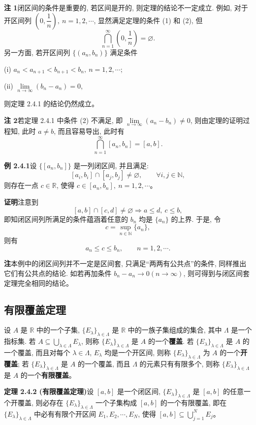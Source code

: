 \documentclass[UTF8, 12pt, fontset=fandol, oneside]{ctexart}
\begin{document}
\noindent\textbf{注 1}\quad 闭区间的条件是重要的, 若区间是开的, 则定理的结论不一定成立. 例如, 对于开区间列 $\left(0,\dfrac1n\right),\ n=1,2,\cdots$, 显然满足定理的条件 (1) 和 (2), 但
\[
  \bigcap_{n=1}^\infty\left(0,\frac1n\right)=\varnothing.
\]
另一方面, 若开区间列 $\{(a_n,b_n)\}$ 满足条件

(i) $a_n<a_{n+1}<b_{n+1}<b_n,\ n=1,2,\cdots$;

(ii) $\lim\limits_{n\to\infty}(b_n-a_n)=0$,

则定理 2.4.1 的结论仍然成立。

\noindent\textbf{注 2}\quad 若定理 2.4.1 中条件 (2) 不满足, 即 $\lim\limits_{n\to\infty}(a_n-b_n)\ne0$, 则由定理的证明过程知, 此时 $a\ne b$, 而且容易导出, 此时有
\[
  \bigcap_{n=1}^\infty [a_n,b_n]=[a,b].
\]

\noindent\textbf{例 2.4.1}\quad 设 $\{[a_n,b_n]\}$ 是一列闭区间, 并且满足:
\[
  [a_i,b_i]\cap[a_j,b_j]\ne\varnothing,\qquad \forall i,j\in\mathbb{N},
\]
则存在一点 $c\in\mathbb{R}$, 使得 $c\in[a_n,b_n],\ n=1,2,\cdots$。

\noindent\textbf{证明}\quad 注意到
\[
  [a,b]\cap[c,d]\ne\varnothing\Rightarrow a\leqslant d,\ c\leqslant b,
\]
即知闭区间列所满足的条件蕴涵着任意的 $b_n$ 均是 $\{a_n\}$ 的上界. 于是, 令
\[
  c=\sup_{n\in\mathbb{N}}\{a_n\},
\]
则有
\[
  a_n\leqslant c\leqslant b_n,\qquad n=1,2,\cdots .
\]

\noindent\textbf{注}\quad 本例中的闭区间列并不一定是区间套, 只满足``两两有公共点''的条件, 同样推出它们有公共点的结论. 如若再加条件 $b_n-a_n\to0(n\to\infty)$, 则可得到与闭区间套定理完全相同的结论。

\subsection{有限覆盖定理}

设 $A$ 是 $\mathbb{R}$ 中的一个子集, $\{E_\lambda\}_{\lambda\in\Lambda}$ 是 $\mathbb{R}$ 中的一族子集组成的集合, 其中 $\Lambda$ 是一个指标集. 若 $A\subseteq\bigcup_{\lambda\in\Lambda}E_\lambda$, 则称 $\{E_\lambda\}_{\lambda\in\Lambda}$ 是 $A$ 的一个\textbf{覆盖}. 若 $\{E_\lambda\}_{\lambda\in\Lambda}$ 是 $A$ 的一个覆盖, 而且对每个 $\lambda\in\Lambda$, $E_\lambda$ 均是一个开区间, 则称 $\{E_\lambda\}_{\lambda\in\Lambda}$ 为 $A$ 的一个\textbf{开覆盖}; 若 $\{E_\lambda\}_{\lambda\in\Lambda}$ 是 $A$ 的一个覆盖, 而且 $\Lambda$ 的元素只有有限多个, 则称 $\{E_\lambda\}_{\lambda\in\Lambda}$ 是 $A$ 的一个\textbf{有限覆盖}。

\noindent\textbf{定理 2.4.2 (有限覆盖定理)}\quad 设 $[a,b]$ 是一个闭区间, $\{E_\lambda\}_{\lambda\in\Lambda}$ 是 $[a,b]$ 的任意一个开覆盖, 则必存在 $\{E_\lambda\}_{\lambda\in\Lambda}$ 一个子集构成 $[a,b]$ 的一个有限覆盖, 即在 $\{E_\lambda\}_{\lambda\in\Lambda}$ 中必有有限个开区间 $E_1,E_2,\cdots,E_N$, 使得 $[a,b]\subseteq\bigcup\limits_{j=1}^N E_j$。
\end{document}
